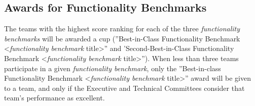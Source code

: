 
\subsection{Awards for Functionality Benchmarks}
\label{sec:AwardFBMs}
The teams with the highest score ranking for each of the three \emph{functionality benchmarks} will be awarded a cup (''\erlir Best-in-Class Functionality Benchmark <\emph{functionality benchmark} title>'' and '\erlir Second-Best-in-Class Functionality Benchmark <\emph{functionality benchmark} title>'').
When less than three teams participate in a given \emph{functionality benchmark}, only the ''\erlir Best-in-class Functionality Benchmark <\emph{functionality benchmark} title>'' award will be given to a team, and only if the Executive and Technical Committees consider that team's performance as excellent.




